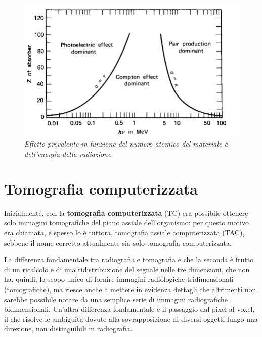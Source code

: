 \begin{figure}[htp]
\centering
\includegraphics[scale=0.45]{Immagini/effetti.png}
\caption{\label{fig:effetti} \textit{Effetto prevalente in funzione del numero atomico del materiale e dell'energia della radiazione}.}
\end{figure}

\section{Tomografia computerizzata}
Inizialmente, con la \textbf{tomografia computerizzata} (TC) era possibile ottenere solo immagini tomografiche del piano assiale dell'organismo: per questo motivo era chiamata, e spesso lo è tuttora, tomografia assiale computerizzata (TAC), sebbene il nome corretto attualmente sia solo tomografia computerizzata.

La differenza fondamentale tra radiografia e tomografia è che la seconda è frutto di un ricalcolo e di una ridistribuzione del segnale nelle tre dimensioni, che non ha, quindi, lo scopo unico di fornire immagini radiologiche tridimensionali (tomografiche), ma riesce anche a mettere in evidenza dettagli che altrimenti non sarebbe possibile notare da una semplice serie di immagini radiografiche bidimensionali. Un'altra differenza fondamentale è il passaggio dal pixel al voxel, il che risolve le ambiguità dovute alla sovrapposizione di diversi oggetti lungo una direzione, non distinguibili in radiografia.

